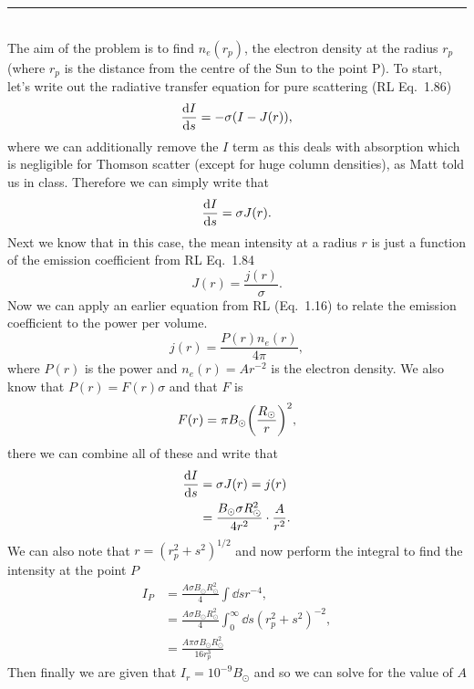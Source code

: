 \documentclass[12pt, letterpaper, twoside]{article}
\newcommand{\answer}[1]{
    \par\noindent\rule{\textwidth}{0.4pt}\\#1\\
}
\begin{document}
\answer{
    The aim of the problem is to find $n_e(r_p)$, the electron density at the radius $r_p$ (where $r_p$ is the distance from the centre of the Sun to the point P). To start, let's write out the radiative transfer equation for pure scattering (RL Eq.~1.86)
    \begin{equation}
        \dv{I}{s} = - \sigma (I - J(r)),
    \end{equation}
    where we can additionally remove the $I$ term as this deals with absorption which is negligible for Thomson scatter (except for huge column densities), as Matt told us in class. Therefore we can simply write that
    \begin{equation}
        \dv{I}{s} = \sigma J(r).
    \end{equation}
    Next we know that in this case, the mean intensity at a radius $r$ is just a function of the emission coefficient from RL Eq.~1.84
    \begin{equation}
        J(r) = \frac{j(r)}{\sigma}.
    \end{equation}
    Now we can apply an earlier equation from RL (Eq.~1.16) to relate the emission coefficient to the power per volume.
    \begin{equation}
        j(r) = \frac{P(r) n_e(r)}{4 \pi},
    \end{equation}
    where $P(r)$ is the power and $n_e(r) = A r^{-2}$ is the electron density. We also know that $P(r) = F(r) \sigma$ and that $F$ is
    \begin{equation}
        F(r) = \pi B_{\odot} \qty(\frac{R_\odot}{r})^2,
    \end{equation}
    there we can combine all of these and write that
    \begin{align}
        \dv{I}{s} &= \sigma J(r) = j(r) \\
                  &= \frac{B_\odot \sigma R_\odot^2}{4 r^2} \cdot \frac{A}{r^2}.
    \end{align}
    We can also note that $r = (r_p^2 + s^2)^{1/2}$ and now perform the integral to find the intensity at the point $P$
    \begin{align}
        I_P &= \frac{A \sigma B_{\odot} R_\odot^2}{4} \int \dd{s} r^{-4}, \\
            &= \frac{A \sigma B_{\odot} R_\odot^2}{4} \int_0^{\infty} \dd{s} (r_p^2 + s^2)^{-2}, \\
            &= \frac{A \pi \sigma B_{\odot} R_\odot^2}{16 r_p^3}
    \end{align}
    Then finally we are given that $I_r = 10^{-9} B_\odot$ and so we can solve for the value of $A$
}
\end{document}

